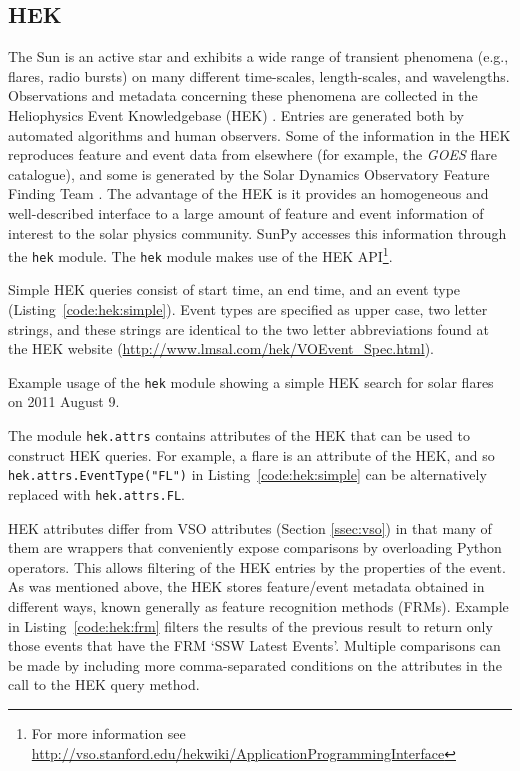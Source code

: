 \subsection{HEK}\label{ssec:hek}

The Sun is an active star and exhibits a wide range of transient phenomena 
(e.g., flares, radio bursts) on many different time-scales, length-scales, and 
wavelengths. Observations and metadata concerning these phenomena are collected 
in the Heliophysics Event Knowledgebase (HEK) \citep{hek2012}.  Entries are generated both by 
automated algorithms and human observers.  Some of the information in the HEK 
reproduces feature and event data from elsewhere (for example, the \textit{GOES} flare catalogue),
and some is generated by the Solar Dynamics Observatory Feature Finding Team 
\citep{martens2012}.  The advantage of the HEK is it 
provides an homogeneous and well-described interface to a large amount of 
feature and event information of interest to the solar physics community. SunPy 
accesses this information through the \texttt{hek} module.  The \texttt{hek} module makes use of the 
HEK API\footnote{For more information see \url{http://vso.stanford.edu/hekwiki/ApplicationProgrammingInterface}}.

Simple HEK queries consist of start time, an end time, and an event type 
(Listing~\ref{code:hek:simple}). Event types are specified as upper case, 
two letter strings, and these strings are 
identical to the two letter abbreviations found at the HEK website
(\url{http://www.lmsal.com/hek/VOEvent_Spec.html}).

\begin{listing}[H]
\caption{Example usage of the \texttt{hek} module showing a simple HEK search for solar flares
on 2011 August 9.}
\label{code:hek:simple}
\end{listing}

The module \texttt{hek.attrs} contains attributes of the HEK that can be used to
construct HEK queries.  For example, a flare is an attribute of the HEK,
 and so 
\texttt{hek.attrs.EventType("FL")} in Listing~\ref{code:hek:simple}
can be alternatively replaced with \texttt{hek.attrs.FL}. 

HEK attributes differ from VSO attributes (Section \ref{ssec:vso}) in that many 
of them are wrappers that conveniently expose comparisons by overloading Python 
operators. This allows filtering of the HEK entries by the properties of the 
event. As was mentioned above, the HEK stores feature/event metadata obtained 
in different ways, known generally as feature recognition methods (FRMs). 
Example in Listing~\ref{code:hek:frm} filters the results of the previous 
result to return only those events that have the FRM `SSW Latest Events'.  Multiple comparisons can be made by including more comma-separated
conditions on the attributes in the call to the HEK query method.

